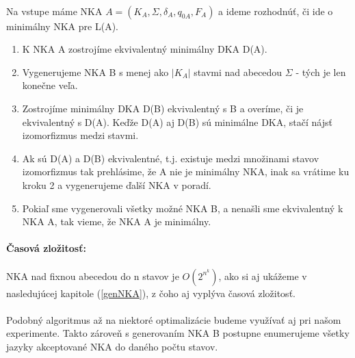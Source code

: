 \paragraph{}
Na vstupe máme NKA $A=(K_A,\Sigma,\delta_A,q_{0A},F_A)$ a ideme rozhodnúť, či ide o minimálny NKA pre L(A).
\\
\begin{enumerate}
  \item K NKA A zostrojíme ekvivalentný minimálny DKA D(A).
  \item Vygenerujeme NKA B s menej ako $|K_A|$ stavmi nad abecedou $\Sigma$ - tých je len konečne veľa.
  \item Zostrojíme minimálny DKA D(B) ekvivalentný s B a overíme, či je ekvivalentný s D(A). Keďže D(A) aj D(B) sú minimálne DKA, stačí nájsť izomorfizmus medzi stavmi.
  \item Ak sú D(A) a D(B) ekvivalentné, t.j. existuje medzi množinami stavov izomorfizmus tak prehlásime, že A nie je minimálny NKA, inak sa vrátime ku kroku 2 a vygenerujeme ďalší NKA v poradí.
  \item Pokiaľ sme vygenerovali všetky možné NKA B, a nenašli sme ekvivalentný k NKA A, tak vieme, že NKA A je minimálny.
\end{enumerate}

\paragraph{Časová zložitosť: }
NKA nad fixnou abecedou do n stavov je $O(2^{n^k})$, ako si aj ukážeme v nasledujúcej kapitole (\ref{genNKA}), z čoho aj vyplýva časová zložitosť.

\paragraph{}
Podobný algoritmus až na niektoré optimalizácie budeme využívať aj pri našom experimente. Takto zároveň s generovaním NKA B postupne enumerujeme všetky jazyky akceptované NKA do daného počtu stavov.